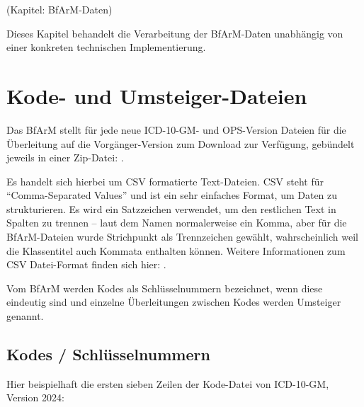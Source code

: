 (Kapitel: BfArM-Daten)

Dieses Kapitel behandelt die Verarbeitung der BfArM-Daten unabhängig von einer konkreten technischen Implementierung. 

\section{Kode- und Umsteiger-Dateien}

Das BfArM stellt für jede neue ICD-10-GM- und OPS-Version Dateien für die Überleitung auf die Vorgänger-Version zum Download zur Verfügung, gebündelt jeweils in einer Zip-Datei: \citep[Downloads]{bfarmdl}.

Es handelt sich hierbei um CSV formatierte Text-Dateien. CSV steht für ``Comma-Separated Values'' und ist ein sehr einfaches Format, um Daten zu strukturieren. Es wird ein Satzzeichen verwendet, um den restlichen Text in Spalten zu trennen -- laut dem Namen normalerweise ein Komma, aber für die BfArM-Dateien wurde Strichpunkt als Trennzeichen gewählt, wahrscheinlich weil die Klassentitel auch Kommata enthalten können. Weitere Informationen zum CSV Datei-Format finden sich hier: \citep[Seite 131f]{bonnefoy2024definitive}. 

Vom BfArM werden Kodes als Schlüsselnummern bezeichnet, wenn diese eindeutig sind und einzelne Überleitungen zwischen Kodes werden Umsteiger genannt.

\subsection{Kodes / Schlüsselnummern}

Hier beispielhaft die ersten sieben Zeilen der Kode-Datei von ICD-10-GM, Version 2024:


